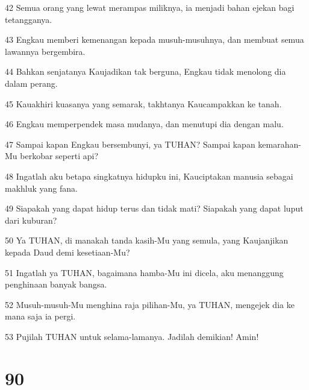 \par 42 Semua orang yang lewat merampas miliknya, ia menjadi bahan ejekan bagi tetangganya.
\par 43 Engkau memberi kemenangan kepada musuh-musuhnya, dan membuat semua lawannya bergembira.
\par 44 Bahkan senjatanya Kaujadikan tak berguna, Engkau tidak menolong dia dalam perang.
\par 45 Kauakhiri kuasanya yang semarak, takhtanya Kaucampakkan ke tanah.
\par 46 Engkau memperpendek masa mudanya, dan menutupi dia dengan malu.
\par 47 Sampai kapan Engkau bersembunyi, ya TUHAN? Sampai kapan kemarahan-Mu berkobar seperti api?
\par 48 Ingatlah aku betapa singkatnya hidupku ini, Kauciptakan manusia sebagai makhluk yang fana.
\par 49 Siapakah yang dapat hidup terus dan tidak mati? Siapakah yang dapat luput dari kuburan?
\par 50 Ya TUHAN, di manakah tanda kasih-Mu yang semula, yang Kaujanjikan kepada Daud demi kesetiaan-Mu?
\par 51 Ingatlah ya TUHAN, bagaimana hamba-Mu ini dicela, aku menanggung penghinaan banyak bangsa.
\par 52 Musuh-musuh-Mu menghina raja pilihan-Mu, ya TUHAN, mengejek dia ke mana saja ia pergi.
\par 53 Pujilah TUHAN untuk selama-lamanya. Jadilah demikian! Amin!

\chapter{90}

